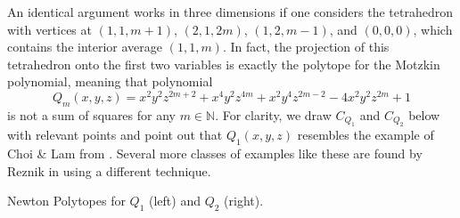 \documentclass[oneside,hidelinks,indentfirst,10pt]{book}
\begin{document}
An identical argument works in three dimensions if one considers the tetrahedron with vertices at \((1,1,m+1)\), \((2,1,2m)\), \((1,2,m-1)\), and \((0,0,0)\), which contains the interior average \((1,1,m)\). In fact, the projection of this tetrahedron onto the first two variables is exactly the polytope for the Motzkin polynomial, meaning that polynomial
\[
    Q_m(x,y,z)=x^2y^2z^{2m+2}+x^4y^2z^{4m}+x^2y^4z^{2m-2}-4x^2y^2z^{2m}+1
\]
is not a sum of squares for any \(m\in\mathbb{N}\). For clarity, we draw \(C_{Q_1}\) and \(C_{Q_2}\) below with relevant points and point out that \(Q_1(x,y,z)\) resembles the example of Choi \& Lam from \cite{CL2}. Several more classes of examples like these are found by Reznik in \cite[\S 7]{reznik_extpsd} using a different technique.
\smallskip
\begin{center}
Newton Polytopes for \(Q_1\) (left) and \(Q_2\) (right).\\[0.5em] 
\end{center}
\end{document}
